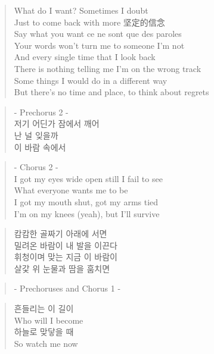 \clearpage

\begin{verse}
What do I want? Sometimes I doubt\\
Just to come back with more 坚定的信念\\
Say what you want ce ne sont que des paroles\\
Your words won't turn me to someone I'm not\\
And every single time that I look back\\
There is nothing telling me I'm on the wrong track\\
Some things I would do in a different way\\
But there's no time and place, to think about regrets
\end{verse}

\begin{verse}
- Prechorus 2 -\\
저기 \ks 어딘가 \ks 잠에서 \ks 깨어\\
난 \ks 널 \ks 잊을까\\
이 \ks 바람 \ks 속에서
\end{verse}

\begin{verse}
- Chorus 2 -\\
I got my eyes wide open still I fail to see\\
What everyone wants me to be\\
I got my mouth shut, got my arms tied\\
I'm on my knees (yeah), but I'll survive
\end{verse}

\begin{verse}
캄캄한 \ks 골짜기 \ks 아래에 \ks 서면\\
밀려온 \ks 바람이 \ks 내 \ks 발을 \ks 이끈다\\
휘청이며 \ks 맞는 \ks 지금 \ks 이 \ks 바람이\\
살갗 \ks 위 \ks 눈물과 \ks 땀을 \ks 훔치면
\end{verse}

\begin{verse}
- Prechoruses and Chorus 1 -
\end{verse}

\begin{verse}
흔들리는 \ks 이 \ks 길이\\
Who will I become\\
하늘로 \ks 맞닿을 \ks 때\\
So watch me now
\end{verse}

\clearpage
